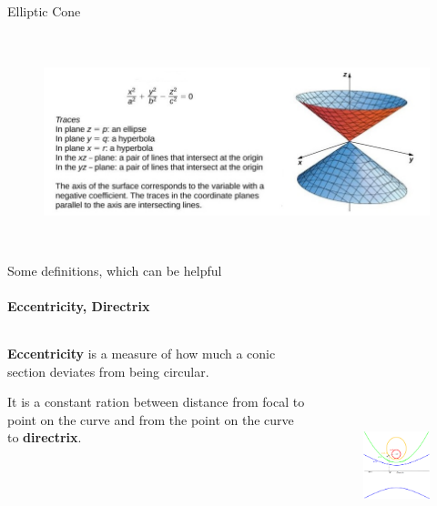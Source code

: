 \documentclass[aspectratio=169,notes]{beamer}
\begin{document}
\begin{frame}[t]{Elliptic Cone}
\framesubtitle{}
    \vspace{-0.6cm}
    \begin{figure}[H]
        \centering\includegraphics[height=6cm,width=1\textwidth,keepaspectratio]{elliptic_cone.jpg}
        \label{fig:elliptic_cone.jpg}
    \end{figure}
\end{frame}

\begin{frame}[t]{Some definitions, which can be helpful}
\framesubtitle{Eccentricity, Directrix}
    \begin{columns}[T,onlytextwidth]
        \begin{column}{0.59\textwidth}
            \textbf{Eccentricity} is a measure of how much a conic section deviates from being circular. \medskip
        
            It is a constant ration between distance from focal to point on the curve and from the point on the curve to \textbf{directrix}.
        \end{column}
        \begin{column}{0.39\textwidth}
            \vspace{-1cm}
            \begin{figure}[H]
                    \centering\includegraphics[height=7cm,width=1\textwidth,keepaspectratio]{eccentricity.png}
                    \label{fig:eccentricity.png}
            \end{figure}
        \end{column}
    \end{columns}
\end{frame}
\end{document}
